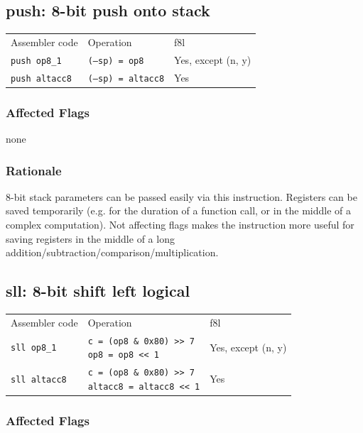 \documentclass{book}
\begin{document}
\subsection{push: 8-bit push onto stack}

\begin{tabular}{l l l}
Assembler code        & Operation                 & f8l \\
\texttt{push op8\_1}  & \texttt{(--sp) = op8}     & Yes, except (n, y) \\
\texttt{push altacc8} & \texttt{(--sp) = altacc8} & Yes
\end{tabular}

\subsubsection*{Affected Flags}

none

\subsubsection*{Rationale}

8-bit stack parameters can be passed easily via this instruction. Registers can be saved temporarily (e.g. for the duration of a function call, or in the middle of a complex computation). Not affecting flags makes the instruction more useful for saving registers in the middle of a long addition\slash subtraction\slash comparison\slash multiplication.


\subsection{sll: 8-bit shift left logical}

\begin{tabular}{l l l}
Assembler code       & Operation                                                                   & f8l \\
\texttt{sll op8\_1}  & \makecell{\texttt{c = (op8 \& 0x80) >> 7}\\\texttt{op8 = op8 << 1}}         & Yes, except (n, y) \\
\texttt{sll altacc8} & \makecell{\texttt{c = (op8 \& 0x80) >> 7}\\\texttt{altacc8 = altacc8 << 1}} & Yes
\end{tabular}

\subsubsection*{Affected Flags}
\end{document}
